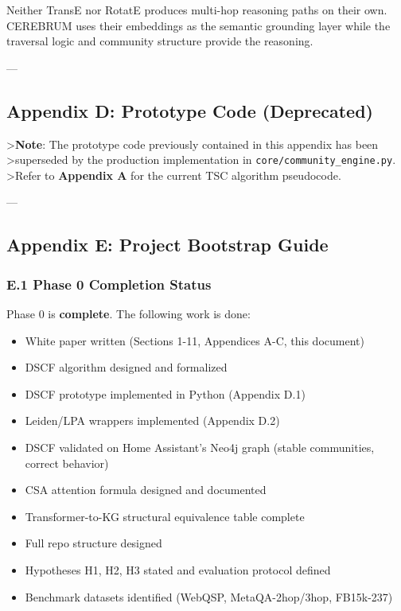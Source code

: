 \documentclass[10pt,journal,compsoc]{IEEEtran}
\begin{document}
Neither TransE nor RotatE produces multi-hop reasoning paths on their own.
CEREBRUM uses their embeddings as the semantic grounding layer while the
traversal logic and community structure provide the reasoning.

---

\subsection{Appendix D: Prototype Code (Deprecated)}

\textgreater  \textbf{Note}: The prototype code previously contained in this appendix has been
\textgreater  superseded by the production imple\-mentation in \texttt{core/community\_engine.py}.
\textgreater  Refer to \textbf{Appendix A} for the current TSC algorithm pseudocode.

---

\subsection{Appendix E: Project Bootstrap Guide}

\subsubsection{E.1 Phase 0 Completion Status}

Phase 0 is \textbf{complete}. The following work is done:

\begin{itemize}
\item [x] White paper written (Sections 1-11, Appendices A-C, this document)
\item [x] DSCF algorithm designed and formalized
\item [x] DSCF prototype implemented in Python (Appendix D.1)
\item [x] Leiden/LPA wrappers implemented (Appendix D.2)
\item [x] DSCF validated on Home Assistant's Neo4j graph (stable communities, correct behavior)
\item [x] CSA attention formula designed and documented
\item [x] Transformer-to-KG structural equivalence table complete
\item [x] Full repo structure designed
\item [x] Hypotheses H1, H2, H3 stated and evaluation protocol defined
\item [x] Benchmark datasets identified (WebQSP, MetaQA-2hop/3hop, FB15k-237)

\end{itemize}
\end{document}

